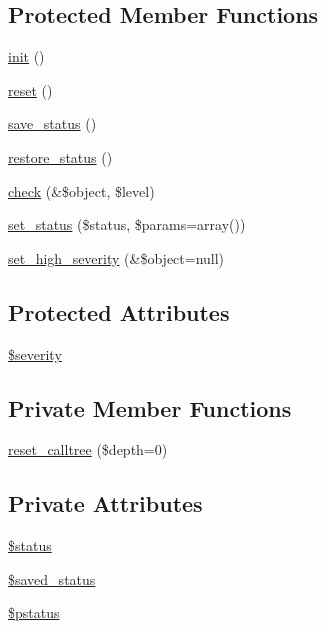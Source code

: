 \subsection*{Protected Member Functions}
\begin{DoxyCompactItemize}
\item 
\hyperlink{class__OWL_ae0ef3ded56e8a6b34b6461e5a721cd3e}{init} ()
\item 
\hyperlink{class__OWL_a2f2a042bcf31965194c03033df0edc9b}{reset} ()
\item 
\hyperlink{class__OWL_a9e49b9c76fbc021b244c6915ea536d71}{save\_\-status} ()
\item 
\hyperlink{class__OWL_a465eeaf40edd9f9c848841700c32ce55}{restore\_\-status} ()
\item 
\hyperlink{class__OWL_ad6f4f6946f40199dd0333cf219fa500e}{check} (\&\$object, \$level)
\item 
\hyperlink{class__OWL_aea912d0ede9b3c2a69b79072d94d4787}{set\_\-status} (\$status, \$params=array())
\item 
\hyperlink{class__OWL_a576829692a3b66e3d518853bf43abae3}{set\_\-high\_\-severity} (\&\$object=null)
\end{DoxyCompactItemize}
\subsection*{Protected Attributes}
\begin{DoxyCompactItemize}
\item 
\hyperlink{class__OWL_ad26b40a9dbbacb33e299b17826f8327c}{\$severity}
\end{DoxyCompactItemize}
\subsection*{Private Member Functions}
\begin{DoxyCompactItemize}
\item 
\hyperlink{class__OWL_a91389e63fc76f6513147f302cbd92a2e}{reset\_\-calltree} (\$depth=0)
\end{DoxyCompactItemize}
\subsection*{Private Attributes}
\begin{DoxyCompactItemize}
\item 
\hyperlink{class__OWL_aaf448f6bc8a90e20c09e9e2b8fe46eb5}{\$status}
\item 
\hyperlink{class__OWL_a3fd6a7b2389b745c00a419dfb8cd7724}{\$saved\_\-status}
\item 
\hyperlink{class__OWL_af30c6ce2c59df6da2ef0f7059be9231e}{\$pstatus}
\end{DoxyCompactItemize}


